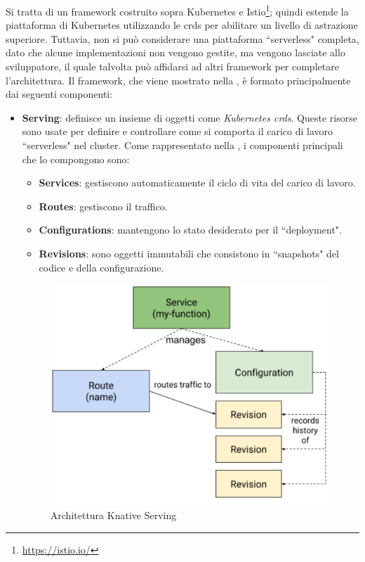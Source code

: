 \documentclass[12pt,a4paper,openany,twoside]{book}
\begin{document}
Si tratta di un framework costruito sopra Kubernetes e Istio\footnote{\url{https://istio.io/}}; quindi estende la piattaforma di Kubernetes utilizzando le \acp{crd} per abilitare un livello di astrazione superiore. Tuttavia, non si può considerare una piattaforma ``serverless" completa, dato che alcune implementazioni non vengono gestite, ma vengono lasciate allo sviluppatore, il quale talvolta può affidarsi ad altri framework per completare l'architettura.
Il framework, che viene mostrato nella , è formato principalmente dai seguenti componenti:
\begin{itemize}
    \item \textbf{Serving}: definisce un insieme di oggetti come \textit{Kubernetes \acp{crd}}. Queste risorse sono usate per definire e controllare come si comporta il carico di lavoro ``serverless" nel cluster. Come rappresentato nella , i componenti principali che lo compongono sono:
        \begin{itemize}
            \item \textbf{Services}: gestiscono automaticamente il ciclo di vita del carico di lavoro.
            
            \item \textbf{Routes}: gestiscono il traffico.
            
            \item \textbf{Configurations}: mantengono lo stato desiderato per il ``deployment".
            
            \item \textbf{Revisions}: sono oggetti immutabili che consistono in ``snapshots" del codice e della configurazione.
        \end{itemize}
        
    \begin{figure}[h]
        \centering
        \includegraphics[width=0.9\linewidth]{figures/knative_serving.pdf}
        \caption{Architettura Knative Serving}
        \label{fig:architettura-knative-serving}
    \end{figure}
    

\end{itemize}
\end{document}
